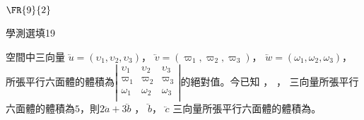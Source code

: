 \begin{QUESTIONS}
\begin{QUESTION}
        \begin{QFROMS}
        \end{QFROMS}
        \begin{QTAGS}\end{QTAGS}
        \begin{QANS}
            $\FR{9}{2}$
        \end{QANS}
        \begin{QSOLLIST}
        \end{QSOLLIST}
        \begin{QEMPTYSPACE}
        \end{QEMPTYSPACE}
    \end{QUESTION}
    \begin{QUESTION}
        \begin{ExamInfo}{85}{學測}{選填}{19}
        \end{ExamInfo}
        \begin{ExamAnsRateInfo}{}{}{}{}
        \end{ExamAnsRateInfo}
        \begin{QBODY}
            空間中三向量 $\lvec{u}=\left( {{\upsilon }_{1}},{{\upsilon }_{2}},{{\upsilon }_{3}} \right)$， $\lvec{v}=\left( {{\varpi }_{1}},{{\varpi }_{2}},{{\varpi }_{3}} \right)$， $\lvec{w}=\left( {{\omega }_{1}},{{\omega }_{2}},{{\omega }_{3}} \right)$，所張平行六面體的體積為$\left| \begin{matrix}
            {{\upsilon }_{1}} & {{\upsilon }_{2}} & {{\upsilon }_{3}}  \\
            {{\varpi }_{1}} & {{\varpi }_{2}} & {{\varpi }_{3}}  \\
            {{\omega }_{1}} & {{\omega }_{2}} & {{\omega }_{3}}  \\
            \end{matrix} \right|$的絕對值。今已知 ， ， 三向量所張平行六面體的體積為$5$，則$2\lvec{a} +3 \lvec{b}$ ， $\lvec{b}$， $\lvec{c}$ 三向量所張平行六面體的體積為\TCNBOX{\TCN\TCN}。
            

\end{QBODY}
\end{QUESTION}
\end{QUESTIONS}
